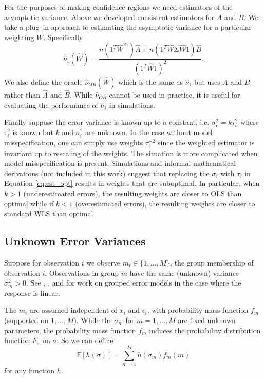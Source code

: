 \documentclass[ejs,ps,preprint]{imsart}
\numberwithin{equation}{section}
\theoremstyle{plain}
\newcommand{\E}{\mathbb{E}}
\def\E{\mathbb{E}}
\begin{document}
For the purposes of making confidence regions we need estimators of the asymptotic variance. Above we developed consistent estimators for $A$ and $B$. We take a plug--in approach to estimating the asymptotic variance for a particular weighting $W$. Specifically
\begin{equation}
  \label{eq:nuhat1}
\widehat{\nu}_1(\widehat{W}) = \frac{n(1^T\widehat{W}^21)\widehat{A} + n(1^T\widehat{W}\Sigma\widehat{W}1)\widehat{B}}{(1^T\widehat{W}1)^2}.
\end{equation}
We also define the oracle $\widehat{\nu}_{OR}(\widehat{W})$ which is the same as $\widehat{\nu}_1$ but uses $A$ and $B$ rather than $\widehat{A}$ and $\widehat{B}$. While $\widehat{\nu}_{OR}$ cannot be used in practice, it is useful for evaluating the performance of $\widehat{\nu}_1$ in simulations.

Finally suppose the error variance is known up to a constant, i.e. $\sigma_i^2 = k \tau_i^2$ where $\tau_i^2$ is known but $k$ and $\sigma_i^2$ are unknown. In the case without model misspecification, one can simply use weights $\tau_i^{-2}$ since the weighted estimator is invariant up to rescaling of the weights. The situation is more complicated when model misspecification is present. Simulations and informal mathematical derivations (not included in this work) suggest that replacing the $\sigma_i$ with $\tau_i$ in Equation \eqref{eq:est_opt} results in weights that are suboptimal. In particular, when $k > 1$ (underestimated errors), the resulting weights are closer to OLS than optimal while if $k < 1$ (overestimated errors), the resulting weights are closer to standard WLS than optimal.

\subsection{Unknown Error Variances}
\label{sec:unknown}

Suppose for observation $i$ we observe $m_i \in \{1,\ldots,M\}$, the group membership of observation $i$. Observations in group $m$ have the same (unknown) variance $\sigma_{m}^2 > 0$. See \cite{fuller1978estimation}, \cite{chen1993iterative}, and \cite{hooper1993iterative} for work on grouped error models in the case where the response is linear.

The $m_i$ are assumed independent of $x_i$ and $\epsilon_i$, with probability mass function $f_m$ (supported on $1,\ldots,M$). While the $\sigma_m$ for $m=1,\ldots,M$ are fixed unknown parameters, the probability mass function $f_m$ induces the probability distribution function $F_\sigma$ on $\sigma$. So we can define
\begin{equation*}
\E[h(\sigma)] = \sum_{m=1}^M h(\sigma_m) f_m(m)
\end{equation*}
for any function $h$.
\end{document}
